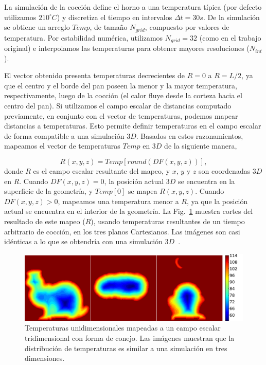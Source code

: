 La simulación de la cocción define el horno a una temperatura típica (por defecto utilizamos $210^{\circ}C$) y discretiza el tiempo en intervalos $\Delta t = 30s$.
De la simulación se obtiene un arreglo $Temp$, de tamaño $N_{grid}$, compuesto por valores de temperatura.
Por estabilidad numérica, utilizamos $N_{grid}=32$ (como en el trabajo original) e interpolamos las temperaturas para obtener mayores resoluciones ($N_{int}$). 

El vector obtenido presenta temperaturas decrecientes de $R = 0$ a $R = L/2$, ya que el centro y el borde del pan poseen la menor y la mayor temperatura, respectivamente, luego de la cocción (el calor fluye desde la corteza hacia el centro del pan). 
Si utilizamos el campo escalar de distancias computado previamente, en conjunto con el vector de temperaturas, podemos mapear distancias a temperaturas.
Esto permite definir temperaturas en el campo escalar de forma compatible a una simulación $3D$.
Basados en estos razonamientos, mapeamos el vector de temperaturas $Temp$ en $3D$ de la siguiente manera,

\begin{equation*}
\displaystyle R(x,y,z) = Temp[ round( DF(x,y,z) ) ], 
\end{equation*}
%
donde $R$ es el campo escalar resultante del mapeo, y $x$, $y$ y $z$ son coordenadas $3D$ en $R$. Cuando $DF(x,y,z) = 0$, la posición actual $3D$ se encuentra en la superficie de la geometría, y $Temp[0]$ se mapea $R(x,y,z)$.
Cuando $DF(x,y,z) > 0$, mapeamos una temperatura menor a $R$, ya que la posición actual se encuentra en el interior de la geometría.
La Fig.~\ref{fg:baking} muestra cortes del resultado de este mapeo ($R$), usando temperaturas resultantes de un tiempo arbitrario de cocción, en los tres planos Cartesianos. 
Las imágenes son casi idénticas a lo que se obtendría con una simulación $3D$~\cite{Purlis2010}.

\begin{figure}
\includegraphics[width=13cm]{figures/tempsbunny}
\caption[Temperaturas unidimensionales mapeadas a un campo escalar tridimensional con forma de conejo]{Temperaturas unidimensionales mapeadas a un campo escalar tridimensional con forma de conejo. Las imágenes muestran que la distribución de temperaturas es similar a una simulación en tres dimensiones.}
\label{fg:baking}
\end{figure}

